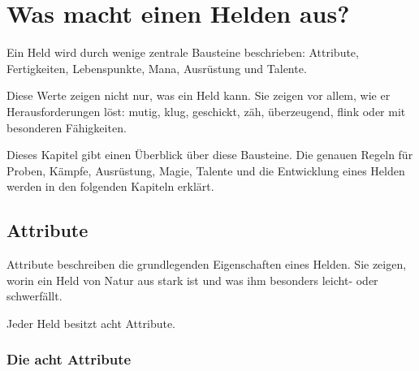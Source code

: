 \chapter{Was macht einen Helden aus?}
\label{chap:hero-basics}

Ein Held wird durch wenige zentrale Bausteine beschrieben: Attribute, Fertigkeiten, Lebenspunkte, Mana, Ausrüstung und Talente.

Diese Werte zeigen nicht nur, was ein Held kann. Sie zeigen vor allem, wie er Herausforderungen löst: mutig, klug, geschickt, zäh, überzeugend, flink oder mit besonderen Fähigkeiten.

Dieses Kapitel gibt einen Überblick über diese Bausteine. Die genauen Regeln für Proben, Kämpfe, Ausrüstung, Magie, Talente und die Entwicklung eines Helden werden in den folgenden Kapiteln erklärt.

\section{Attribute}

Attribute beschreiben die grundlegenden Eigenschaften eines Helden. Sie zeigen, worin ein Held von Natur aus stark ist und was ihm besonders leicht- oder schwerfällt.

Jeder Held besitzt acht Attribute.

\subsection{Die acht Attribute}

